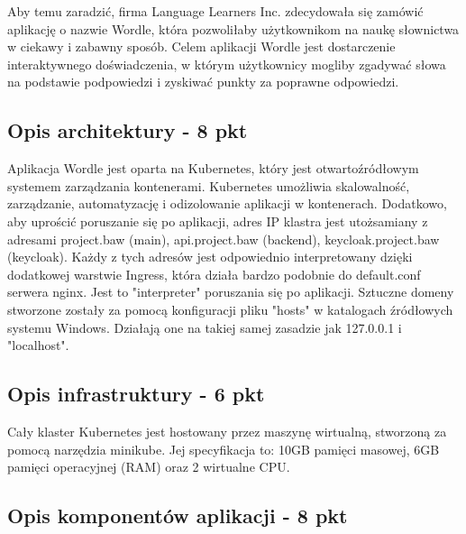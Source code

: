 \documentclass[12pt,a4paper]{article}
\begin{document}
Aby temu zaradzić, firma Language Learners Inc. zdecydowała się zamówić aplikację o nazwie Wordle, która pozwoliłaby użytkownikom na naukę słownictwa w ciekawy i zabawny sposób. Celem aplikacji Wordle jest dostarczenie interaktywnego doświadczenia, w którym użytkownicy mogliby zgadywać słowa na podstawie podpowiedzi i zyskiwać punkty za poprawne odpowiedzi.

\subsection{Opis architektury - 8 pkt}
\label{sec:introduction}
Aplikacja Wordle jest oparta na Kubernetes, który jest otwartoźródłowym systemem zarządzania kontenerami. Kubernetes umożliwia skalowalność, zarządzanie, automatyzację i odizolowanie aplikacji w kontenerach. Dodatkowo, aby uprościć poruszanie się po aplikacji, adres IP klastra jest utożsamiany z adresami project.baw (main), api.project.baw (backend), keycloak.project.baw (keycloak). Każdy z tych adresów jest odpowiednio interpretowany dzięki dodatkowej warstwie Ingress, która działa bardzo podobnie do default.conf serwera nginx. Jest to "interpreter" poruszania się po aplikacji. Sztuczne domeny stworzone zostały za pomocą konfiguracji pliku "hosts" w katalogach źródłowych systemu Windows. Działają one na takiej samej zasadzie jak 127.0.0.1 i "localhost".

\subsection{Opis infrastruktury - 6 pkt}
\label{sec:Users}

Cały klaster Kubernetes jest hostowany przez maszynę wirtualną, stworzoną za pomocą narzędzia minikube. Jej specyfikacja to: 10GB pamięci masowej, 6GB pamięci operacyjnej (RAM) oraz 2 wirtualne CPU.\\

\subsection{Opis komponentów aplikacji - 8 pkt}
\label{sec:FunctionalConditions}

\end{document}
